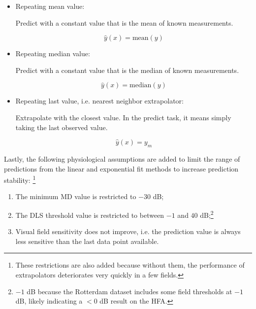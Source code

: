\begin{itemize}
	\item Repeating mean value:
	
	Predict with a constant value that is the mean of known measurements.
	
	\begin{equation}
		\hat{y}(x)=\textrm{mean}(y)
	\end{equation}
	
	\item Repeating median value:
	
	Predict with a constant value that is the median of known measurements.
	
	\begin{equation}
	\hat{y}(x)=\textrm{median}(y)
	\end{equation}
	
	\item Repeating last value, i.e. nearest neighbor extrapolator:
	
	Extrapolate with the closest value. In the predict task, it means simply taking the last observed value.
	
	\begin{equation}
		\hat{y}(x)=y_m
	\end{equation}
	
\end{itemize}

Lastly, the following physiological assumptions are added to limit the range of predictions from the linear and exponential fit methods to increase prediction stability: \footnote{These restrictions are also added because without them, the performance of extrapolators deteriorates very quickly in a few fields.}

\begin{enumerate}
	\item The minimum MD value is restricted to $-30$ dB;
	\item The \ac{DLS} threshold value is restricted to between $-1$ and $40$ dB;\footnote{$-1$ dB because the Rotterdam dataset includes some field thresholds at $-1$ dB, likely indicating a $<0$ dB result on the \ac{HFA}.} 
	\item Visual field sensitivity does not improve, i.e. the prediction value is always less sensitive than the last data point available.
\end{enumerate}


